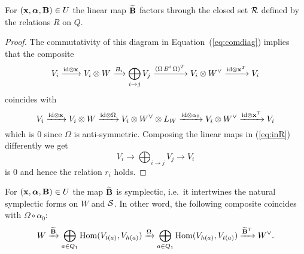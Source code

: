 \documentclass{amsart}
\newcommand{\balpha}{\boldsymbol{\alpha}}
\theoremstyle{definition}
\begin{document}
\begin{lemma}\label{lem:rela}
For $(\bfx, \balpha, \bfB) \in U$ 
the linear map $\widetilde{\mathbf{B}}$ factors through the closed set $\mathcal{R}$ defined by the relations $R$ on $Q$.
\end{lemma}

\begin{proof}
The commutativity of this diagram in Equation~(\ref{eq:comdiag}) implies that the composite 
\begin{equation}\label{eq:inR}
    V_{i} \xrightarrow{\textup{id} \otimes \mathbf{x}} V_{i} \otimes W \xrightarrow{B_{i}} \bigoplus_{i \rightarrow j} V_j \xrightarrow{(\Omega\,B^i \, \Omega)^T} V_{i} \otimes W^\vee \xrightarrow{\textup{id} \otimes \mathbf{x}^T} V_i
\end{equation}
coincides with
$$V_i \xrightarrow{\textup{id} \otimes \mathbf{x}} V_i \otimes W \xrightarrow{\textup{id} \otimes \Omega} V_i \otimes W^\vee \otimes L_W \xrightarrow{\textup{id} \otimes \alpha_0} V_i \otimes W^\vee \xrightarrow {\textup{id} \otimes \mathbf{x}^T} V_i$$ 
which is $0$ since $\Omega$ is anti-symmetric.
Composing the linear maps in (\ref{eq:inR}) differently we get $$V_i \longrightarrow \bigoplus_{i \rightarrow j} V_j \longrightarrow V_i$$
is 0 and hence the relation $r_i$ holds.
\end{proof}

\begin{lemma}\label{lem:symp2}
For $(\bfx, \balpha, \bfB) \in U$ the map $\widetilde{\mathbf{B}}$ is symplectic, i.e.\ it intertwines the natural symplectic forms on $W$ and $\mathcal{S}$.
In other word, the following composite coincides with $\Omega \circ \alpha_0$:
\begin{equation}
    W \xrightarrow{\widetilde{\mathbf{B}}} \bigoplus_{a \in Q_1} \operatorname{Hom}(V_{t(a)}, V_{h(a)}) \xrightarrow{\Omega} \bigoplus_{a \in Q_1} \operatorname{Hom}(V_{h(a)}, V_{t(a)}) \xrightarrow{\widetilde{\mathbf{B}}^T} W^\vee.
\end{equation}
\end{lemma}
\end{document}

